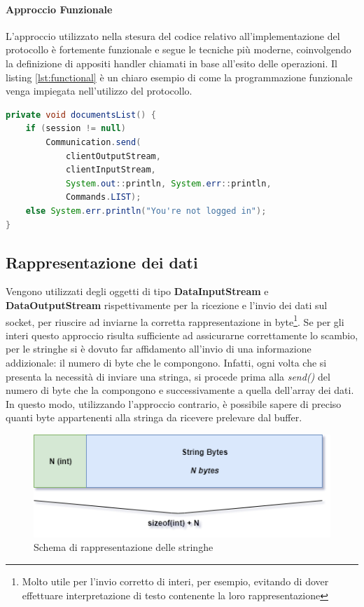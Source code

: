 \paragraph{Approccio Funzionale}
L'approccio utilizzato nella stesura del codice relativo all'implementazione del protocollo è fortemente funzionale e segue le tecniche più moderne, coinvolgendo la definizione di appositi handler chiamati in base all'esito delle operazioni. Il listing \ref{lst:functional} è un chiaro esempio di come la programmazione funzionale venga impiegata nell'utilizzo del protocollo.

\begin{lstlisting}[language=java, caption="Frammento in cui si evidenzia l'approccio funzionale del protocollo", label={lst:functional}, float]
private void documentsList() {
	if (session != null)
		Communication.send(
			clientOutputStream,
			clientInputStream,
			System.out::println, System.err::println,
			Commands.LIST);
	else System.err.println("You're not logged in");
}
\end{lstlisting}

\subsection{Rappresentazione dei dati}\label{rappresentazione_dei_dati}
Vengono utilizzati degli oggetti di tipo \textbf{DataInputStream} e \textbf{DataOutputStream} rispettivamente per la ricezione e l'invio dei dati sul socket, per riuscire ad inviarne la corretta rappresentazione in byte\footnote{Molto utile per l'invio corretto di interi, per esempio, evitando di dover effettuare interpretazione di testo contenente la loro rappresentazione}. Se per gli interi questo approccio risulta sufficiente ad assicurarne correttamente lo scambio, per le stringhe si è dovuto far affidamento all'invio di una informazione addizionale: il numero di byte che le compongono. Infatti, ogni volta che si presenta la necessità di inviare una stringa, si procede prima alla \textit{send()} del numero di byte che la compongono e successivamente a quella dell'array dei dati. In questo modo, utilizzando l'approccio contrario, è possibile sapere di preciso quanti byte appartenenti alla stringa da ricevere prelevare dal buffer.

\begin{figure}[h]
	\caption{Schema di rappresentazione delle stringhe}
	\centering
	\includegraphics[scale=0.6]{assets/string_representation.png}
\end{figure}


